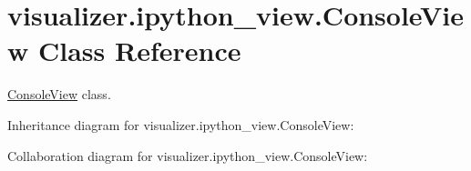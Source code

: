 \hypertarget{classvisualizer_1_1ipython__view_1_1ConsoleView}{}\section{visualizer.\+ipython\+\_\+view.\+Console\+View Class Reference}
\label{classvisualizer_1_1ipython__view_1_1ConsoleView}


\hyperlink{classvisualizer_1_1ipython__view_1_1ConsoleView}{Console\+View} class.  




Inheritance diagram for visualizer.\+ipython\+\_\+view.\+Console\+View\+:


Collaboration diagram for visualizer.\+ipython\+\_\+view.\+Console\+View\+:
